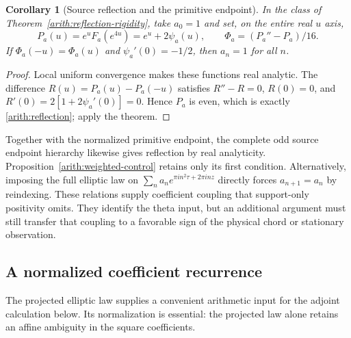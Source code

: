 \documentclass[11pt]{article}
\numberwithin{equation}{section}
\newtheorem{corollary}[theorem]{Corollary}
\theoremstyle{definition}
\theoremstyle{remark}
\begin{document}
\begin{corollary}[Source reflection and the primitive endpoint]
\label{arith:source-rigidity}
In the class of Theorem~\ref{arith:reflection-rigidity}, take $a_0=1$ and
set, on the entire real $u$ axis,
\[
 P_a(u)=e^uF_a(e^{4u})=e^u+2\psi_a(u),\qquad
 \Phi_a=(P_a''-P_a)/16.
\]
If $\Phi_a(-u)=\Phi_a(u)$ and $\psi_a'(0)=-1/2$, then $a_n=1$ for all $n$.
\end{corollary}
\begin{proof}
Local uniform convergence makes these functions real analytic.
The difference $R(u)=P_a(u)-P_a(-u)$ satisfies
$R''-R=0$, $R(0)=0$, and
$R'(0)=2[1+2\psi_a'(0)]=0$.  Hence $P_a$ is even, which is exactly
\eqref{arith:reflection}; apply the theorem.
\end{proof}

Together with the normalized primitive endpoint, the complete odd source
endpoint hierarchy likewise gives reflection by real analyticity.  Proposition~\ref{arith:weighted-control} retains
only its first condition.  Alternatively, imposing the full elliptic law
on $\sum_n a_ne^{\pi in^2\tau+2\pi inz}$ directly forces
$a_{n+1}=a_n$ by reindexing.  These relations supply coefficient coupling
that support-only positivity omits.  They identify the theta input, but
an additional argument must still transfer that coupling to a favorable
sign of the physical chord or stationary observation.

\subsection{A normalized coefficient recurrence}
\label{core:recurrence-subsection}

The projected elliptic law supplies a convenient arithmetic input for the
adjoint calculation below.  Its normalization is essential: the projected
law alone retains an affine ambiguity in the square coefficients.
\end{document}
